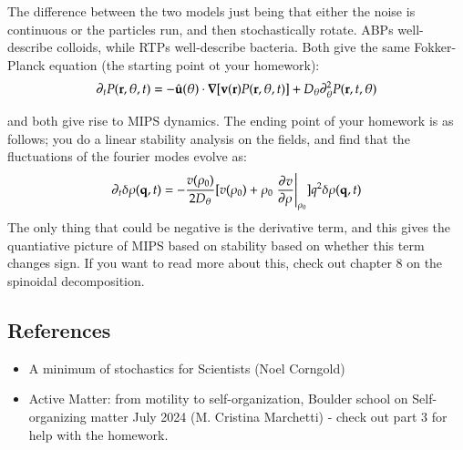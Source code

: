 The difference between the two models just being that either the noise is continuous or the particles run, and then stochastically rotate. ABPs well-describe colloids, while RTPs well-describe bacteria. Both give the same Fokker-Planck equation (the starting point ot your homework):
\begin{equation}
    \p_t P(\v{r}, \theta, t) = -\hat{\v{u}}(\theta)\cdot \nabla[\v{v}(\v{r})P(\v{r}, \theta, t)] + D_\theta\p_\theta^2P(\v{r}, t, \theta)
\end{equation}

and both give rise to MIPS dynamics. The ending point of your homework is as follows; you do a linear stability analysis on the fields, and find that the fluctuations of the fourier modes evolve as:
\begin{equation}
    \p_t \delta \rho(\v{q}, t) = -\frac{v(\rho_0)}{2D_\theta}[v(\rho_0) + \rho_0\left.\dpd{v}{\rho}\right|_{\rho_0}]q^2\delta \rho(\v{q}, t)
\end{equation}
The only thing that could be negative is the derivative term, and this gives the quantiative picture of MIPS based on stability based on whether this term changes sign. If you want to read more about this, check out chapter 8 on the spinoidal decomposition.

\subsection{References}
\begin{itemize}
    \item A minimum of stochastics for Scientists (Noel Corngold)
    \item Active Matter: from motility to self-organization, Boulder school on Self-organizing matter July 2024 (M. Cristina Marchetti) - check out part 3 for help with the homework.
\end{itemize}
